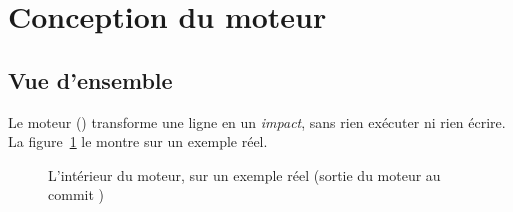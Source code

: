 \section{Conception du moteur}
\label{sec:moteur}

\subsection{Vue d'ensemble}
Le moteur () transforme une ligne en un \emph{impact}, sans
rien exécuter ni rien écrire. La figure~\ref{fig:moteur} le montre sur un exemple réel.

\begin{figure}[htbp]
\centering
\makebox[\linewidth][c]{}
\caption{L'intérieur du moteur, sur un exemple réel (sortie du moteur au commit \commitref{})}
\label{fig:moteur}
\end{figure}

